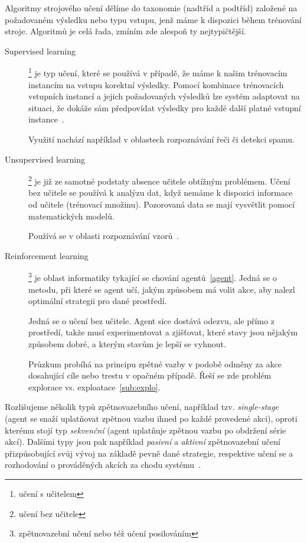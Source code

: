 \documentclass[thesis=M,czech]{FITthesis}[2014/05/07]
\begin{document}
Algoritmy strojového učení dělíme do taxonomie (nadtříd a podtříd) založené na požadovaném výsledku nebo typu vstupu, jenž máme k dispozici během trénování stroje. Algoritmů je celá řada, zmíním zde alespoň ty nejtypičtější. 

\begin{description}
  \item[Supervised learning]\footnote{učení s učitelem} je typ učení, které se používá v případě, že máme k našim trénovacím instancím na vstupu korektní výsledky. Pomocí kombinace trénovacích vstupních instancí a jejich požadovaných výsledků lze systém adaptovat na situaci, že dokáže sám předpovídat výsledky pro každé další platné vstupní instance~\cite{aihorizon}.
  
  Využití nachází například v oblastech rozpoznávání řeči či detekci spamu.
  \item[Unsupervised learning]\footnote{učení bez učitele} je již ze samotné podstaty absence učitele obtížným problémem. Učení bez učitele se používá k analýzu dat, když nemáme k dispozici informace od učitele (trénovací množinu). Pozorovaná data se mají vysvětlit pomocí matematických modelů.
  
  Používá se v oblasti rozpoznávání vzorů~\cite{hlavac}.
  \item[Reinforcement learning]\footnote{zpětnovazební učení nebo též učení posilováním} je oblast informatiky tykající se chování agentů~\ref{agent}. Jedná se o metodu, při které se agent učí, jakým způsobem má volit akce, aby nalezl optimální strategii pro dané prostředí.
  
  Jedná se o učení bez učitele. Agent sice dostává odezvu, ale přímo z prostředí, takže musí experimentovat a zjišťovat, které stavy jsou nějakým způsobem dobré, a kterým stavům je lepší se vyhnout.
  
  Průzkum probíhá na principu zpětné vazby v podobě odměny za akce dosahující cíle nebo trestu v opačném případě. Řeší se zde problém explorace vs. exploatace~\ref{sub:explo}. 
\end{description}

Rozlišujeme několik typů zpětnovazebního učení, například tzv. \emph{single-stage} (agent se snaží uplatňovat zpětnou vazbu ihned po každé provedené akci), oproti kterému stojí typ \emph{sekvenční} (agent uplatňuje zpětnou vazbu po obdržení série akcí). Dalšími typy jsou pak například \emph{pasivní} a \emph{aktivní} zpětnovazební učení přizpůsobující svůj vývoj na základě pevně dané strategie, respektive učení se a rozhodování o prováděných akcích za chodu systému~\cite{reinforcement}.
\end{document}
